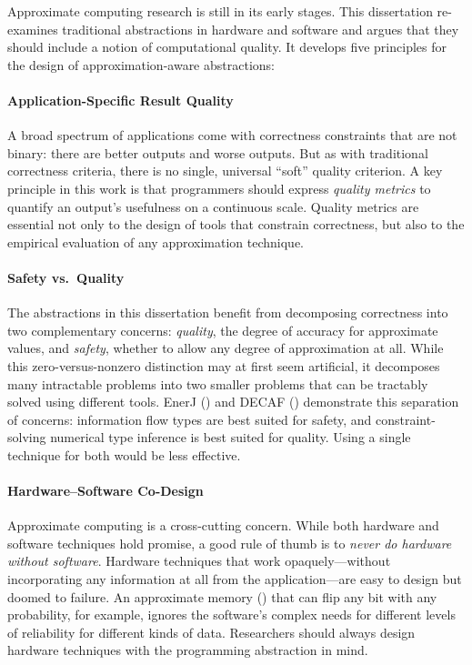 Approximate computing research is still in its early stages.
This dissertation re-examines traditional abstractions in hardware and
software and argues that they should include a notion of computational
quality.
It develops five principles for the design of approximation-aware
abstractions:

\paragraph{Application-Specific Result Quality}
A broad spectrum of applications come with correctness constraints that are
not binary:
there are better outputs and worse outputs.
But as with traditional correctness criteria, there is no single, universal
``soft'' quality criterion.
A key principle in this work is that programmers should express
\emph{quality metrics} to quantify an output's usefulness on a continuous
scale.
Quality metrics are essential not only to the design of tools that constrain
correctness,
but also to the empirical evaluation of any approximation technique.

\paragraph{Safety vs.~Quality}
The abstractions in this dissertation benefit from decomposing correctness
into two complementary concerns:
\emph{quality}, the degree of accuracy for approximate values, and
\emph{safety}, whether to allow any degree of approximation at all.
While this zero-versus-nonzero distinction may at first seem artificial, it
decomposes many intractable problems into two smaller problems that can be
tractably solved using different tools.
EnerJ () and DECAF () demonstrate this separation of
concerns:
information flow types are best suited for safety,
and constraint-solving numerical type inference is best suited for quality.
Using a single technique for both would be less effective.

\paragraph{Hardware--Software Co-Design}
Approximate computing is a cross-cutting concern.
While both hardware and software techniques hold promise, a good rule of thumb
is to \emph{never do hardware without software}.
Hardware techniques that work opaquely---without incorporating any information
at all from the application---are easy to design but doomed to failure.
An approximate memory () that can flip any bit with any
probability, for example,
ignores the software's complex needs for different levels of reliability for
different kinds of data.
Researchers should always design hardware techniques with the programming
abstraction in mind.


